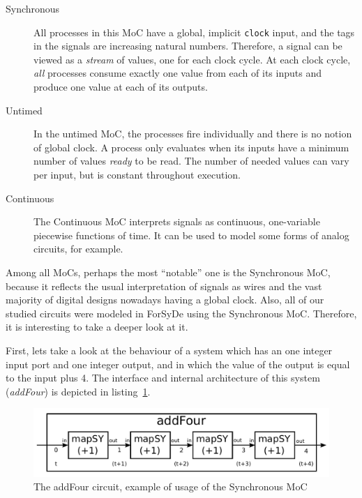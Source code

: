            \begin{description}
                \item[Synchronous] All processes in this \ac{MoC} have a global, implicit
                    \texttt{clock} input, and the tags in the signals are increasing natural
                    numbers. Therefore, a signal can be viewed as a \emph{stream} of values, one for
                    each clock cycle. At each clock cycle, \emph{all} processes consume exactly one
                    value from each of its inputs and produce one value at each of its outputs.

                \item[Untimed] In the untimed \ac{MoC}, the processes fire individually and there is
                    no notion of global clock. A process only evaluates when its inputs have a
                    minimum number of values \emph{ready} to be read. The number of needed values
                    can vary per input, but is constant throughout execution.

                \item[Continuous] The Continuous \ac{MoC} interprets signals as continuous,
                    one-variable piecewise functions of time. It can be used to model some forms of
                    analog circuits, for example.
            \end{description}

            \label{ref:forsyde-moc-synch}
            Among all \acp{MoC}, perhaps the most ``notable'' one is the Synchronous \ac{MoC},
            because it reflects the usual interpretation of signals as wires and the vast majority
            of digital designs nowadays having a global clock. Also, all of our studied circuits
            were modeled in ForSyDe using the Synchronous \ac{MoC}. Therefore, it is interesting to
            take a deeper look at it.

            First, lets take a look at the behaviour of a system which has an one integer input port
            and one integer output, and in which the value of the output is equal to the input plus
            4. The interface and internal architecture of this system (\emph{addFour}) is depicted
            in listing~\ref{lst:forsyde-addFour}.

            \begin{figure}[h!]
                \includegraphics[width=1.0\textwidth]{imgs/forsyde-addFour.pdf}
                \caption{The addFour circuit, example of usage of the Synchronous \ac{MoC}
                    \label{lst:forsyde-addFour}}
            \end{figure}

